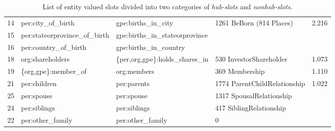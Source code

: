 \documentclass[paper=a4,fontsize=11pt]{scrartcl}
\numberwithin{equation}{section}    %
\numberwithin{figure}{section}      %
\numberwithin{table}{section}       %
\begin{document}
\begin{table}[htbp]
\begin{adjustwidth}{-2.5cm}{}
{\begin{tabular}{r l l l l}
14 & per:city_of_birth                   & gpe:births_in_city                    & 1261 BeBorn (814 Places)     &  2.216 \\
15 & per:stateorprovince_of_birth        & gpe:births_in_stateorprovince                                                 \\
16 & per:country_of_birth                & gpe:births_in_country                                                         \\
\club{}
18 & org:shareholders                    & \{per,org,gpe\}:holds_shares_in       & 530 InvestorShareholder      &  1.073 \\
19 & \{org,gpe\}:member_of               & org:members                           & 369 Membership               &  1.110 \\
\midrule
\midrule
21 & per:children                        & per:parents                           & 1774 ParentChildRelationship &  1.022 \\
25 & per:spouse                          & per:spouse                            & 1317 SpousalRelationship              \\
24 & per:siblings                        & per:siblings                          & 417 SiblingRelationship              \\
22 & per:other_family                    & per:other_family                      & 0                                    \\
\end{tabular}}
\caption{List of entity valued slots divided into two categories of
    \textit{hub-slots} and \textit{nonhub-slots}.}
\label{tab:slots}
\end{adjustwidth}
\end{table}
\end{document}
